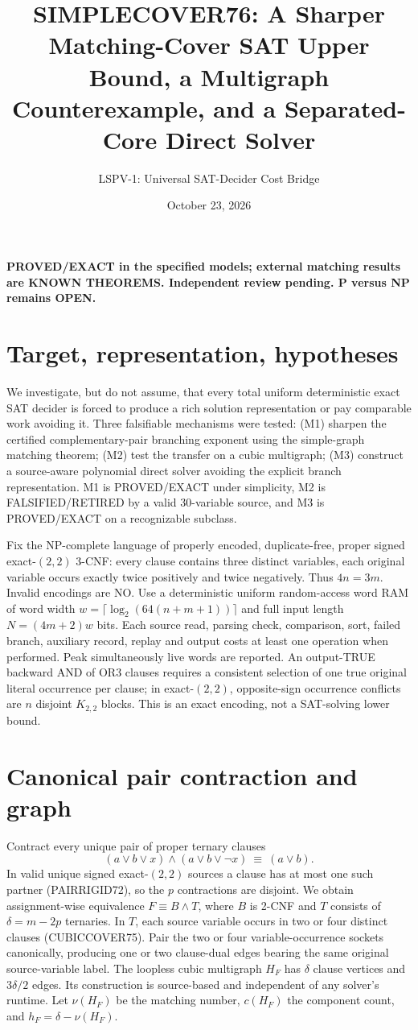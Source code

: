 \documentclass[11pt]{article}
\title{SIMPLECOVER76: A Sharper Matching-Cover SAT Upper Bound, a Multigraph Counterexample, and a Separated-Core Direct Solver}
\author{LSPV-1: Universal SAT-Decider Cost Bridge}
\date{October 23, 2026}
\begin{document}
\maketitle
\begin{center}\textbf{PROVED/EXACT in the specified models; external matching results are KNOWN THEOREMS. Independent review pending. P versus NP remains OPEN.}\end{center}

\section{Target, representation, hypotheses}
We investigate, but do not assume, that every total uniform deterministic exact SAT decider is forced to produce a rich solution representation or pay comparable work avoiding it. Three falsifiable mechanisms were tested: (M1) sharpen the certified complementary-pair branching exponent using the simple-graph matching theorem; (M2) test the transfer on a cubic multigraph; (M3) construct a source-aware polynomial direct solver avoiding the explicit branch representation. M1 is PROVED/EXACT under simplicity, M2 is FALSIFIED/RETIRED by a valid 30-variable source, and M3 is PROVED/EXACT on a recognizable subclass.

Fix the NP-complete language of properly encoded, duplicate-free, proper signed exact-$(2,2)$ 3-CNF: every clause contains three distinct variables, each original variable occurs exactly twice positively and twice negatively. Thus $4n=3m$. Invalid encodings are NO. Use a deterministic uniform random-access word RAM of word width $w=\lceil\log_2(64(n+m+1))\rceil$ and full input length $N=(4m+2)w$ bits. Each source read, parsing check, comparison, sort, failed branch, auxiliary record, replay and output costs at least one operation when performed. Peak simultaneously live words are reported. An output-TRUE backward AND of OR3 clauses requires a consistent selection of one true original literal occurrence per clause; in exact-$(2,2)$, opposite-sign occurrence conflicts are $n$ disjoint $K_{2,2}$ blocks. This is an exact encoding, not a SAT-solving lower bound.

\section{Canonical pair contraction and graph}
Contract every unique pair of proper ternary clauses
\[
(a\vee b\vee x)\wedge(a\vee b\vee\neg x)\ \equiv\ (a\vee b).
\]
In valid unique signed exact-$(2,2)$ sources a clause has at most one such partner (PAIRRIGID72), so the $p$ contractions are disjoint. We obtain assignment-wise equivalence $F\equiv B\wedge T$, where $B$ is 2-CNF and $T$ consists of $\delta=m-2p$ ternaries. In $T$, each source variable occurs in two or four distinct clauses (CUBICCOVER75). Pair the two or four variable-occurrence sockets canonically, producing one or two clause-dual edges bearing the same original source-variable label. The loopless cubic multigraph $H_F$ has $\delta$ clause vertices and $3\delta/2$ edges. Its construction is source-based and independent of any solver's runtime. Let $\nu(H_F)$ be the matching number, $c(H_F)$ the component count, and $h_F=\delta-\nu(H_F)$.
\end{document}
